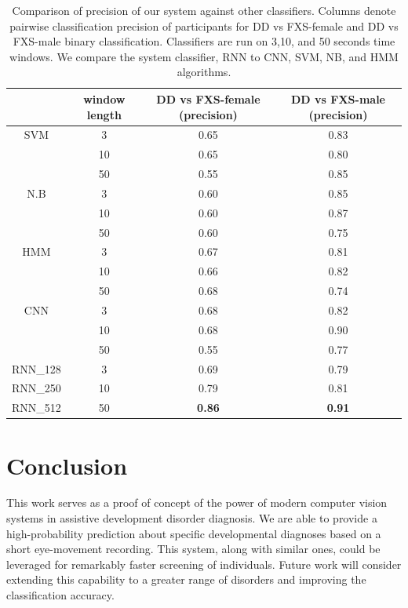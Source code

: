 \documentclass{llncs}
\begin{document}
\begin{table}[t]
    \centering
    \begin{tabular}{c|c|c|c}
      & window length & DD vs FXS-female (precision) & DD vs FXS-male (precision)\\
      \hline
      SVM  & 3   & 0.65 & 0.83\\
      & 10 & 0.65 & 0.80 \\
      & 50 & 0.55 & 0.85 \\

      \hline
      N.B   & 3  & 0.60 & 0.85\\
      & 10 & 0.60 & 0.87\\
      & 50 & 0.60 & 0.75\\

      \hline
      HMM & 3  & 0.67 & 0.81\\
      & 10 & 0.66 & 0.82\\
      & 50 & 0.68 & 0.74\\

      \hline
      CNN & 3 & 0.68 & 0.82 \\
      & 10 & 0.68 & 0.90\\
      & 50 & 0.55 & 0.77\\
      \hline
      RNN\_128  & 3 &  0.69 & 0.79 \\
      RNN\_250 & 10 &   0.79 &  0.81\\
      RNN\_512 &  50 & {\bf 0.86} & {\bf 0.91}\\

    \end{tabular}
    \caption{Comparison of precision of our system against other classifiers. Columns denote pairwise classification precision of participants for DD vs FXS-female and DD vs FXS-male binary classification. Classifiers are run on 3,10, and 50 seconds time windows. We compare the system classifier, RNN to CNN, SVM, NB, and HMM algorithms.}
    \label{table:profiler}
  \end{table}
  

\vspace*{-\baselineskip}
\section{Conclusion}
\vspace*{-\baselineskip}
This work serves as a proof of concept of the power of modern computer vision systems in assistive development disorder diagnosis. We are able to provide a high-probability prediction about specific developmental diagnoses based on a short eye-movement recording. This system, along with similar ones, could be leveraged for remarkably faster screening of individuals. Future work will consider extending this capability to a greater range of disorders and improving the classification accuracy.
  \vspace*{-\baselineskip}
  
  
\end{document}
